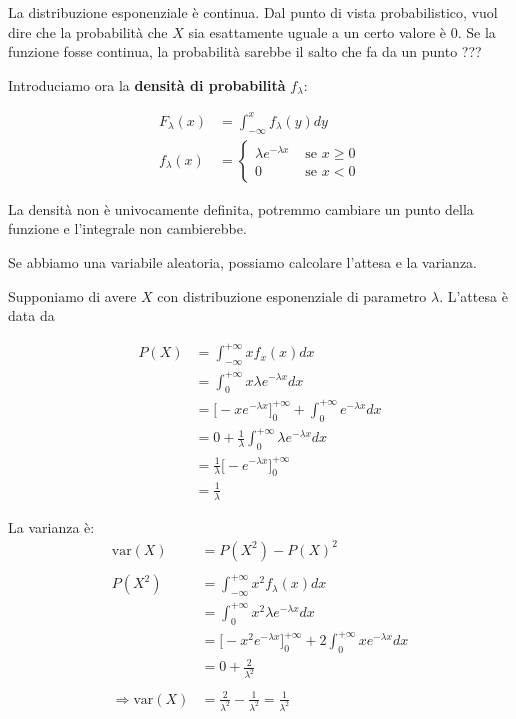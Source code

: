 \documentclass[a4paper,12pt]{book}
\begin{document}
La distribuzione esponenziale è continua. Dal punto di vista probabilistico, vuol dire che la probabilità che $ X $ sia esattamente uguale a un certo valore è 0. Se la funzione fosse continua, la probabilità sarebbe il salto che fa da un punto ??? %

Introduciamo ora la \textbf{densità di probabilità} $ f_\lambda $:

\begin{align*}
	F_\lambda (x) & = \int_{-\infty}^{x} f_\lambda(y)dy \\
	f_\lambda (x) & = \begin{cases}
		\lambda e ^{-\lambda x} & \text{ se } x \ge 0 \\
		0 & \text{ se } x < 0
	\end{cases}
\end{align*}

La densità non è univocamente definita, potremmo cambiare un punto della funzione e l'integrale non cambierebbe. 

Se abbiamo una variabile aleatoria, possiamo calcolare l'attesa e la varianza. 

Supponiamo di avere $ X $ con distribuzione esponenziale di parametro $\lambda$. L'attesa è data da 

\begin{align*}
	P(X) & = \int_{-\infty}^{+\infty} x f_x(x) dx \\
	& = \int_{0}^{+\infty}x \lambda e ^{-\lambda x}dx \\
	& = \bigg[-xe^{-\lambda x} \bigg]_0^{+\infty} + \int_{0}^{+\infty} e ^{-\lambda x}dx  \\
	& = 0 + \frac{1}{\lambda}\int_{0}^{+\infty} \lambda e^{-\lambda x} dx \\
	& = \frac{1}{\lambda}\bigg[-e^{-\lambda x} \bigg]_0^{+\infty} \\
	& = \frac{1}{\lambda}
\end{align*}

La varianza è:
\begin{align*}
	\text{var}(X) & = P(X^2) - P(X)^2 \\
	\\
	P(X^2) & = \int_{-\infty}^{+\infty} x^2 f_\lambda(x) dx \\
	& = \int_{0}^{+\infty} x^2 \lambda e^{-\lambda x} dx \\
	& = \bigg[-x^2e^{-\lambda x} \bigg]_0^{+\infty} + 2\int_0^{+\infty} x e^{-\lambda x} dx \\
	& = 0 + \frac{2}{\lambda^2} \\
	\\
	\Rightarrow \text{var}(X) & = \frac{2}{\lambda^2} - \frac{1}{\lambda^2} = \frac{1}{\lambda^2}
\end{align*}
\end{document}

